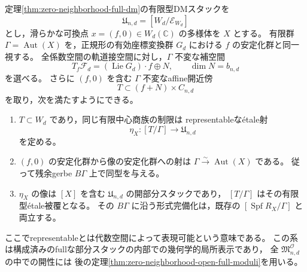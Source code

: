 \begin{corollary}[有限自己同型群を保つ幾何学的slice]
\label{cor:finite-etale-slice-near-classical}
定理\ref{thm:zero-neighborhood-full-dm}の有限型DMスタックを
\[
 \mathfrak U_{n,d}=[W_d/\mathcal E_{W_d}]
\]
とし，滑らかな可換点 $x=(f,0)\in W_d(\mathbb C)$ の多様体を $X$ とする。
有限群 $\Gamma=\operatorname{Aut}(X)$ を，正規形の有効座標変換群 $G_d$ における
$f$ の安定化群と同一視する。
全係数空間の軌道接空間に対し，$\Gamma$ 不変な補空間
\[
 T_f\mathcal F_d=(\operatorname{Lie}G_d)\cdot f\oplus N,
 \qquad \dim N=b_{n,d}
\]
を選べる。
さらに $(f,0)$ を含む $\Gamma$ 不変なaffine開近傍
\[
 T\subset (f+N)\times C_{n,d}
\]
を取り，次を満たすようにできる。
\begin{enumerate}
\item $T\subset W_d$ であり，同じ有限中心商族の制限は
      representableな\'{e}tale射
      \[
       \eta_X:[T/\Gamma]\longrightarrow\mathfrak U_{n,d}
      \]
      を定める。
\item $(f,0)$ の安定化群から像の安定化群への射は
      $\Gamma\xrightarrow{\sim}\operatorname{Aut}(X)$ である。
      従って残余gerbe $B\Gamma$ 上で同型を与える。
\item $\eta_X$ の像は $[X]$ を含む
      $\mathfrak U_{n,d}$ の開部分スタックであり，
      $[T/\Gamma]$ はその有限型\'{e}tale被覆となる。
      その $B\Gamma$ に沿う形式完備化は，既存の
      $[\operatorname{Spf}R_X/\Gamma]$ と両立する。
\end{enumerate}
ここでrepresentableとは代数空間によって表現可能という意味である。
この系は構成済みのfullな部分スタックの内部での幾何学的局所表示であり，
全 $\mathfrak M^{\mathcal O}_{n,d}$ の中での開性には
後の定理\ref{thm:zero-neighborhood-open-full-moduli}を用いる。
\end{corollary}
